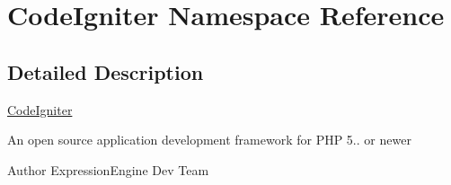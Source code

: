 \hypertarget{namespace_code_igniter}{\section{Code\-Igniter Namespace Reference}
\label{namespace_code_igniter}
}


\subsection{Detailed Description}
\hyperlink{namespace_code_igniter}{Code\-Igniter}

An open source application development framework for P\-H\-P 5.. or newer

\begin{DoxyAuthor}{Author}
Expression\-Engine Dev Team 
\end{DoxyAuthor}
